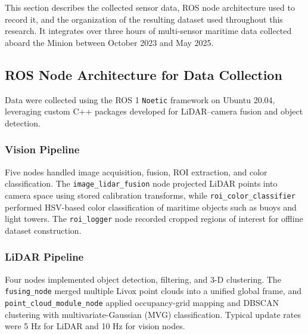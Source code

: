 \documentclass{erauthesis}
\begin{document}

This section describes the collected sensor data, ROS node architecture used to record it, 
and the organization of the resulting dataset used throughout this research.  
It integrates over three hours of multi-sensor maritime data collected aboard the Minion between October 2023 and May 2025.


\subsection{ROS Node Architecture for Data Collection}
\label{sec:ros_architecture}

Data were collected using the ROS 1 \texttt{Noetic} framework on Ubuntu 20.04, 
leveraging custom C++ packages developed for LiDAR–camera fusion and object detection.  

\subsubsection{Vision Pipeline}  
Five nodes handled image acquisition, fusion, ROI extraction, and color classification.  
The \texttt{image\_lidar\_fusion} node projected LiDAR points into camera space using stored calibration transforms,  
while \texttt{roi\_color\_classifier} performed HSV-based color classification of maritime objects such as buoys and light towers.  
The \texttt{roi\_logger} node recorded cropped regions of interest for offline dataset construction.  

\subsubsection{LiDAR Pipeline}  
Four nodes implemented object detection, filtering, and 3-D clustering.  
The \texttt{fusing\_node} merged multiple Livox point clouds into a unified global frame, 
and \texttt{point\_cloud\_module\_node} applied occupancy-grid mapping and DBSCAN clustering with multivariate-Gaussian (MVG) classification.  
Typical update rates were 5 Hz for LiDAR and 10 Hz for vision nodes.  
\end{document}
